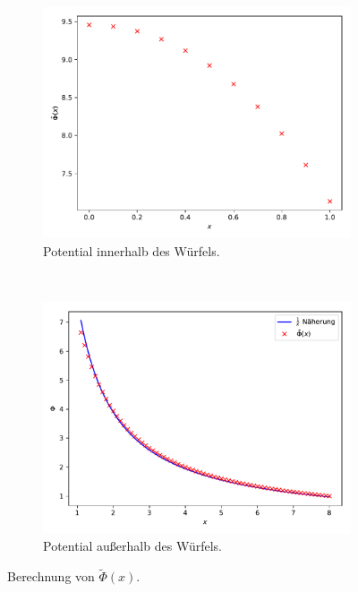 \begin{figure}
  \centering
  \begin{subfigure}[b]{0.45\textwidth}
      \includegraphics[width=\textwidth]{A2/build/innerhalb_a.pdf}
      \caption{Potential innerhalb des Würfels.}
      \label{fig:inn_a}
    \end{subfigure}
    ~ %
    \begin{subfigure}[b]{0.45\textwidth}
      \includegraphics[width=\textwidth]{A2/build/ausserhalb_a.pdf}
      \caption{Potential außerhalb des Würfels.}
      \label{fig:aus_a}
    \end{subfigure}
    \caption{Berechnung von \(\tilde{\Phi}(x)\).}\label{fig:a}
\end{figure}

